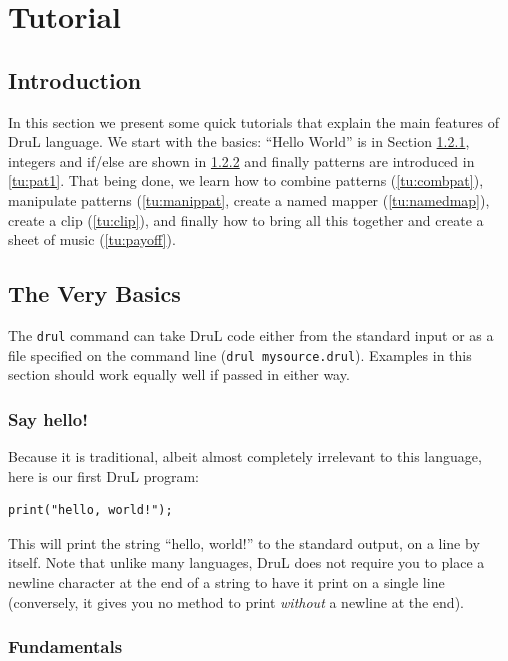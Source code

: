 \chapter{Tutorial}
\section{Introduction}
In this section we present some quick tutorials that explain the main features of DruL
language. We start with the basics: ``Hello World'' is in Section \ref{tu:hello}, integers
and if/else are shown in \ref{tu:fund} and finally patterns are introduced in \ref{tu:pat1}.
That being done, we learn how to combine patterns (\ref{tu:combpat}), manipulate patterns
(\ref{tu:manippat}, create a named mapper (\ref{tu:namedmap}), create a clip (\ref{tu:clip}),
and finally how to bring all this together and create a sheet of music (\ref{tu:payoff}).


\section{The Very Basics}

The {\tt drul} command can take DruL code either from the standard input or as a file specified on the command line ({\tt drul mysource.drul}).  Examples in this section should work equally well if passed in either way.

\subsection{Say hello!} \label{tu:hello}

Because it is traditional, albeit almost completely irrelevant to this language, here is our first
DruL program:

\begin{lstlisting}
print("hello, world!");
\end{lstlisting}

This will print the string ``hello, world!'' to the standard output, on a line by itself.  Note that unlike many languages, DruL does not require you to place a newline character at the end of a string to have it print on a single line (conversely, it gives you no method to print \emph{without} a newline at the end).

\subsection{Fundamentals} \label{tu:fund}

